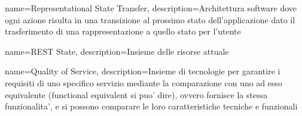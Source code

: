 {
name={Representational State Transfer},
description={Architettura software dove ogni azione risulta in una transizione al prossimo stato
dell'applicazione dato il trasferimento di una rappresentazione a quello stato per l'utente}
}

{
name={REST State},
description={Insieme delle risorse attuale}
}

{
name={Quality of Service},
description={Insieme di tecnologie per garantire i requisiti di uno specifico servizio
mediante la comparazione con uno ad esso equivalente
(functional equivalent si puo' dire), ovvero fornisce la stessa funzionalita', e si possono
comparare le loro caratteristiche tecniche e funzionali}
}

